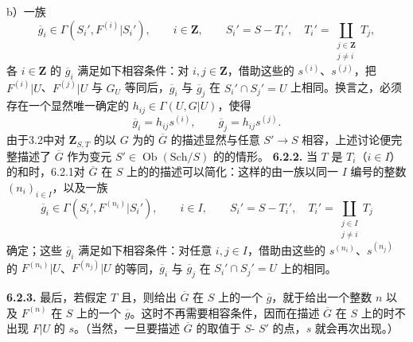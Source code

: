  b）一族
\[
\overline g_i\in\Gamma(S_i',F^{(i)}|S_i'),\qquad i\in\mathbf Z,
\qquad S_i'=S-T_i',\quad T_i'=\coprod_{\substack{j\in\mathbf Z\\j\ne i}}T_j,
\]
各 $i\in\mathbf Z$ 的 $\overline g_i$ 满足如下相容条件：对 $i,j\in\mathbf Z$，借助这些的 $s^{(i)}$、$s^{(j)}$，把 $F^{(i)}|U$、$F^{(j)}|U$ 与 $G_U$ 等同后，$\overline g_i$ 与 $\overline g_j$ 在 $S_i'\cap S_j'=U$ 上相同。换言之，必须存在一个显然唯一确定的 $h_{ij}\in\Gamma(U,G|U)$，使得
\[
\overline g_i=h_{ij}s^{(i)},\qquad \overline g_j=h_{ij}s^{(j)}.
\]
由于3.2中对 $\mathbf Z_{S,T}$ 的以 $G$ 为的 $\overline G$ 的描述显然与任意 $S'\to S$ 相容，上述讨论便完整描述了 $\overline G$ 作为变元 $S'\in\operatorname{Ob}(\mathrm{Sch}/S)$ 的的情形。
\textbf{6.2.2.} 当 $T$ 是 $T_i$（$i\in I$）的和时，6.2.1对 $\overline G$ 在 $S$ 上的的描述可以简化：这样的由一族以同一 $I$ 编号的整数 $(n_i)_{i\in I}$，以及一族
\[
\overline g_i\in\Gamma(S_i',F^{(n_i)}|S_i'),\qquad i\in I,
\qquad S_i'=S-T_i',\quad T_i'=\coprod_{\substack{j\in I\\j\ne i}}T_j
\]
确定；这些 $\overline g_i$ 满足如下相容条件：对任意 $i,j\in I$，借助由这些的 $s^{(n_i)}$、$s^{(n_j)}$ 的 $F^{(n_i)}|U$、$F^{(n_j)}|U$ 的等同，$\overline g_i$ 与 $\overline g_j$ 在 $S_i'\cap S_j'=U$ 上的相同。

\textbf{6.2.3.} 最后，若假定 $T$ 且，则给出 $\overline G$ 在 $S$ 上的一个 $\overline g$，就于给出一个整数 $n$ 以及 $F^{(n)}$ 在 $S$ 上的一个 $\overline g$。这时不再需要相容条件，因而在描述 $\overline G$ 在 $S$ 上的时不出现 $F|U$ 的 $s$。（当然，一旦要描述 $\overline G$ 的取值于 $S$- $S'$ 的点，$s$ 就会再次出现。）


